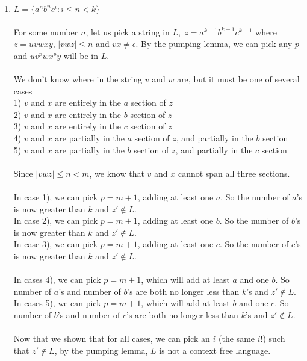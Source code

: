 \documentclass[a4paper]{article}
\begin{document}
\begin{itemize}
\begin{enumerate}
\item $L = \{a^nb^nc^i : i \leq n < k\}$ \\
\\
For some number $n$, let us pick a string in $L,\;z = a^{k-1}b^{k-1}c^{k-1}$ where $z = uvwxy$, $|vwz| \leq n$ and $vx \neq \epsilon$. By the pumping lemma, we can pick any $p$ and $uv^pwx^py$ will be in $L$. \\
\\
We don't know where in the string $v$ and $w$ are, but it must be one of several cases \\
1) $v$ and $x$ are entirely in the $a$ section of $z$ \\
2) $v$ and $x$ are entirely in the $b$ section of $z$ \\
3) $v$ and $x$ are entirely in the $c$ section of $z$ \\
4) $v$ and $x$ are partially in the $a$ section of $z$, and partially in the $b$ section \\
5) $v$ and $x$ are partially in the $b$ section of $z$, and partially in the $c$ section \\
\\
Since $|vwz| \leq n < m$, we know that $v$ and $x$ cannot span all three sections. \\
\\
In case 1), we can pick $p = m+1$, adding at least one $a$. So the number of $a$'s is now greater than $k$ and $z' \notin L$. \\
In case 2), we can pick $p = m+1$, adding at least one $b$. So the number of $b$'s is now greater than $k$ and $z' \notin L$. \\
In case 3), we can pick $p = m+1$, adding at least one $c$. So the number of $c$'s is now greater than $k$ and $z' \notin L$. \\
 \\
In cases 4), we can pick $p = m+1$, which will add at least $a$ and one $b$. So number of $a$'s and number of $b$'s are both no longer less than $k$'s and $z' \notin L$. \\
In cases 5), we can pick $p = m+1$, which will add at least $b$ and one $c$. So number of $b$'s and number of $c$'s are both no longer less than $k$'s and $z' \notin L$. \\
\\
Now that we shown that for all cases, we can pick an $i$ (the same $i$!) such that  $z' \notin L$, by the pumping lemma, $L$ is not a context free language. \\



\end{enumerate}
\end{itemize}
\end{document}
